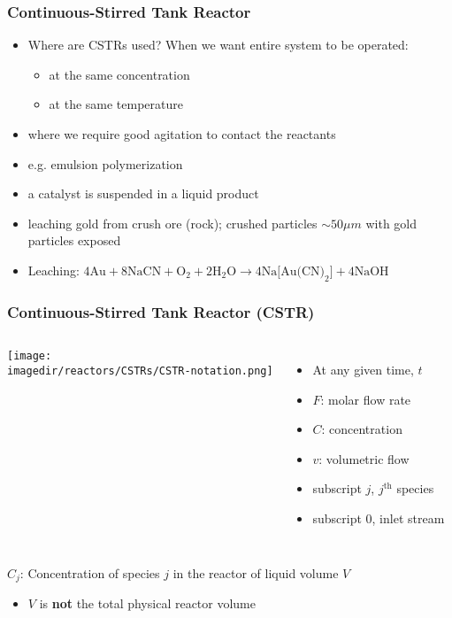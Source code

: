 \begin{frame}\frametitle{Continuous-Stirred Tank Reactor}
	\begin{itemize}
		
		\item	Where are CSTRs used? When we want entire system to be operated:
		\begin{itemize}
			\item	at the same concentration
			\item	at the same temperature
		\end{itemize}
		\item	where we require good agitation to contact the reactants
		\item	e.g. emulsion polymerization
		\item	a catalyst is suspended in a liquid product
		\item	leaching gold from crush ore (rock); crushed particles $\sim 50 \mu m$ with gold particles exposed
		\item	Leaching: $4\text{Au} + 8\text{NaCN} + \text{O}_2 + 2 \text{H}_2\text{O} \longrightarrow  4 \text{Na[Au(CN)}_2\text{]} + 4 \text{NaOH}$
	\end{itemize}
\end{frame}

\begin{frame}\frametitle{Continuous-Stirred Tank Reactor (CSTR)}
	\begin{columns}[c]
			\texttt{[image: \\imagedir/reactors/CSTRs/CSTR-notation.png]}
			\begin{itemize}
				\vspace{-3mm}
				\item	At any given time, $t$
				\item	$F$: molar flow rate
				\item	$C$: concentration
				\item	$v$: volumetric flow
				\item	subscript $j$, $j^\text{th}$ species
				\item	subscript $0$, inlet stream
			\end{itemize}
	\end{columns}
	\vspace{12pt}
	$C_{j}$: Concentration of species $j$ in the reactor of liquid volume $V$
	\vspace{6pt}
	\begin{itemize}
		\item	$V$ is \textbf{not} the total physical reactor volume
	\end{itemize}
\end{frame}

